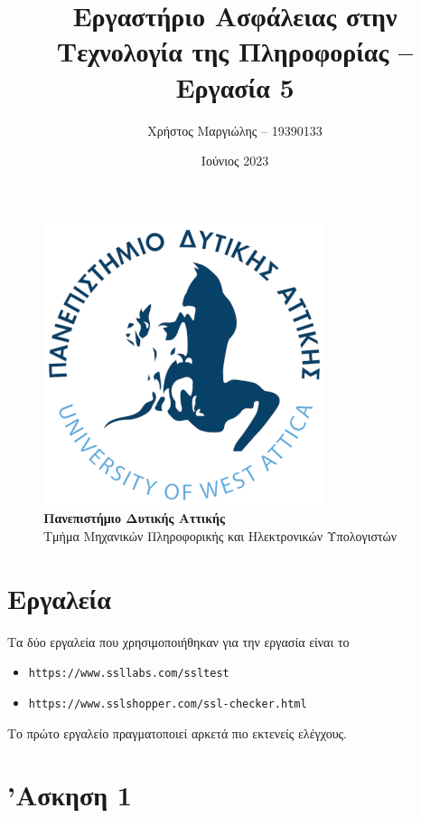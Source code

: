 \documentclass[12pt]{article}
\title{Εργαστήριο Ασφάλειας στην Τεχνολογία της Πληροφορίας -- Εργασία 5}
\author{Χρήστος Μαργιώλης -- 19390133}
\date{Ιούνιος 2023}
\begin{document}
\begin{titlepage}
        \maketitle
        \begin{figure}[t!]
        \begin{center}
        \includegraphics[scale=0.3]{./res/uniwalogo.png} \\
        \Large
        \textbf{Πανεπιστήμιο Δυτικής Αττικής} \\
        \large
        Τμήμα Μηχανικών Πληροφορικής και Ηλεκτρονικών Υπολογιστών
        \end{center}
        \end{figure}
\end{titlepage}

\renewcommand{\contentsname}{Περιεχόμενα}
\tableofcontents
\pagebreak

\section{Εργαλεία}

Τα δύο εργαλεία που χρησιμοποιήθηκαν για την εργασία είναι το
\begin{itemize}
	\item \lstinline{https://www.ssllabs.com/ssltest}
	\item \lstinline{https://www.sslshopper.com/ssl-checker.html}
\end{itemize}

Το πρώτο εργαλείο πραγματοποιεί αρκετά πιο εκτενείς ελέγχους.

\section{'Ασκηση 1}
\end{document}
